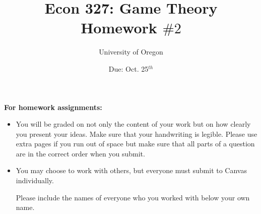 \documentclass[addpoints ]{exam}
\title{
    \textbf{Econ 327: Game Theory} \\ 
    Homework $\#2$
    }
\author{University of Oregon}
\date{Due: Oct. 25$^{th}$}
\begin{document}
\maketitle

\begin{center}
  \gradetable[h][questions]
\end{center}

\vspace{0.5in}

\begin{center}
  \textbf{For homework assignments:}
\end{center}

\begin{itemize}

  
  \item You will be graded on not only the content of your work
  but on how clearly you present your ideas.
  Make sure that your handwriting is legible.
  Please use extra pages if you run out of space 
  but make sure that all parts of a question 
  are in the correct order when you submit.

  \item You may choose to work with others,
  but everyone must submit to Canvas individually.

  Please include the names of everyone who you worked with 
  below your own name.
 
\end{itemize}

\vspace{1.0in}


\vspace{0.5in}


\newpage
\end{document}
